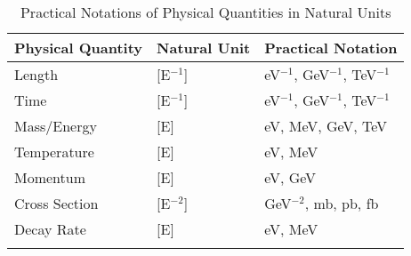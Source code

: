 \documentclass[12pt,a4paper]{article}
\begin{document}
	\begin{table}[ht]
		\centering
		\begin{adjustbox}{scale=1.2}
			\begin{tabular}{lll}
				\hline
				\textbf{Physical Quantity} & \textbf{Natural Unit} & \textbf{Practical Notation} \\
				\hline
				Length & [E$^{-1}$] & eV$^{-1}$, GeV$^{-1}$, TeV$^{-1}$ \\
				Time & [E$^{-1}$] & eV$^{-1}$, GeV$^{-1}$, TeV$^{-1}$ \\
				Mass/Energy & [E] & eV, MeV, GeV, TeV \\
				Temperature & [E] & eV, MeV \\
				Momentum & [E] & eV, GeV \\
				Cross Section & [E$^{-2}$] & GeV$^{-2}$, mb, pb, fb \\
				Decay Rate & [E] & eV, MeV \\
				\hline
				\multicolumn{2}{c}{} \\
				\hline
			\end{tabular}
		\end{adjustbox}
		\caption{Practical Notations of Physical Quantities in Natural Units}
		\label{tab:practical_notation}
	\end{table}
	
\end{document}
